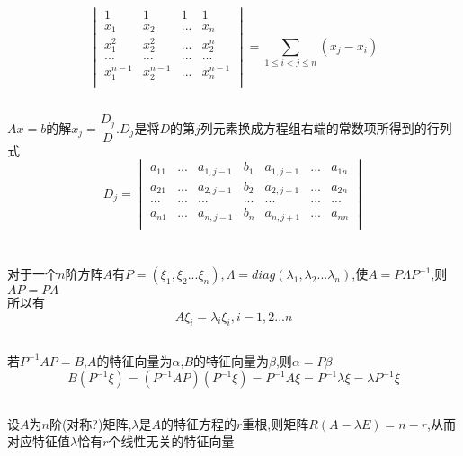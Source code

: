 \documentclass[11pt, a4paper, UTF8]{ctexart}
\begin{document}
\subsection{}
\[
\begin{vmatrix}
1&1&1&1\\
x_1&x_2&...&x_n\\
x_1^2&x_2^2&...&x_2^n\\
...&...&...&...\\
x_1^{n-1}&x_2^{n-1}&...&x_n^{n-1}\\
\end{vmatrix}=\sum_{1\le i<j\le n}(x_j-x_i)
\]
\subsection{}
$Ax=b$的解$x_j=\dfrac{D_j}{D}.D_j$是将$D$的第$j$列元素换成方程组右端的常数项所得到的行列式
\[D_j=\begin{vmatrix}
a_{11}&...&a_{1,j-1}&b_1&a_{1,j+1}&...&a_{1n}\\
a_{21}&...&a_{2,j-1}&b_2&a_{2,j+1}&...&a_{2n}\\
...&...&...&...&...&...&...\\
a_{n1}&...&a_{n,j-1}&b_n&a_{n,j+1}&...&a_{nn}\\
\end{vmatrix}\]
\section{}
\subsection{}
对于一个$n$阶方阵$A$有$P=(\xi_1,\xi_2...\xi_n),\varLambda=diag(\lambda_1,\lambda_2...\lambda_n)$,使$A=P\varLambda P^{-1}$,则$AP=P\varLambda$\\
所以有
\[A\xi_i=\lambda_i\xi_i,i-1,2...n\]
\subsection{}
若$P^{-1}AP=B$,$A$的特征向量为$\alpha$,$B$的特征向量为$\beta$,则$\alpha=P\beta$\\
\[B(P^{-1}\xi)=(P^{-1}AP)(P^{-1}\xi)=P^{-1}A\xi=P^{-1}\lambda\xi=\lambda P^{-1}\xi\]
\subsection{}
设$A$为$n$阶(对称?)矩阵,$\lambda$是$A$的特征方程的$r$重根,则矩阵$R(A-\lambda E)=n-r$,从而对应特征值$\lambda$恰有$r$个线性无关的特征向量
\end{document}
